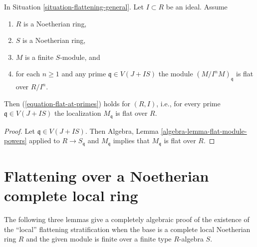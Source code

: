 \begin{lemma}
\label{lemma-flat-module-powers-variant}
In Situation \ref{situation-flattening-general}.
Let $I \subset R$ be an ideal. Assume
\begin{enumerate}
\item $R$ is a Noetherian ring,
\item $S$ is a Noetherian ring,
\item $M$ is a finite $S$-module, and
\item for each $n \geq 1$ and any prime
$\mathfrak q \in V(J + IS)$ the module $(M/I^n M)_{\mathfrak q}$
is flat over $R/I^n$.
\end{enumerate}
Then (\ref{equation-flat-at-primes}) holds for $(R, I)$, i.e.,
for every prime $\mathfrak q \in V(J + IS)$
the localization $M_{\mathfrak q}$ is flat over $R$.
\end{lemma}

\begin{proof}
Let $\mathfrak q \in V(J + IS)$. Then
Algebra, Lemma \ref{algebra-lemma-flat-module-powers}
applied to $R \to S_{\mathfrak q}$ and $M_{\mathfrak q}$
implies that $M_{\mathfrak q}$ is flat over $R$.
\end{proof}










\section{Flattening over a Noetherian complete local ring}
\label{section-flattening-Noetherian-complete-local}

\noindent
The following three lemmas give a completely algebraic proof of the existence
of the ``local'' flattening stratification when the base is a complete
local Noetherian ring $R$ and the given module is finite over a finite
type $R$-algebra $S$.

